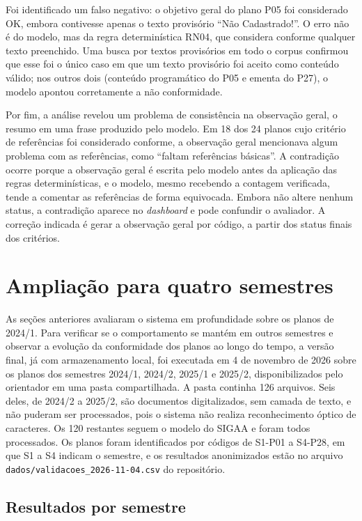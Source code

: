 Foi identificado um falso negativo: o objetivo geral do plano P05 foi considerado OK, embora contivesse apenas o texto provisório ``Não Cadastrado!''. O erro não é do modelo, mas da regra determinística RN04, que considera conforme qualquer texto preenchido. Uma busca por textos provisórios em todo o corpus confirmou que esse foi o único caso em que um texto provisório foi aceito como conteúdo válido; nos outros dois (conteúdo programático do P05 e ementa do P27), o modelo apontou corretamente a não conformidade.

Por fim, a análise revelou um problema de consistência na observação geral, o resumo em uma frase produzido pelo modelo. Em 18 dos 24 planos cujo critério de referências foi considerado conforme, a observação geral mencionava algum problema com as referências, como ``faltam referências básicas''. A contradição ocorre porque a observação geral é escrita pelo modelo antes da aplicação das regras determinísticas, e o modelo, mesmo recebendo a contagem verificada, tende a comentar as referências de forma equivocada. Embora não altere nenhum status, a contradição aparece no \textit{dashboard} e pode confundir o avaliador. A correção indicada é gerar a observação geral por código, a partir dos status finais dos critérios.

\section{Ampliação para quatro semestres}
\label{sec:res-semestres}

As seções anteriores avaliaram o sistema em profundidade sobre os planos de 2024/1. Para verificar se o comportamento se mantém em outros semestres e observar a evolução da conformidade dos planos ao longo do tempo, a versão final, já com armazenamento local, foi executada em 4 de novembro de 2026 sobre os planos dos semestres 2024/1, 2024/2, 2025/1 e 2025/2, disponibilizados pelo orientador em uma pasta compartilhada. A pasta continha 126 arquivos. Seis deles, de 2024/2 a 2025/2, são documentos digitalizados, sem camada de texto, e não puderam ser processados, pois o sistema não realiza reconhecimento óptico de caracteres. Os 120 restantes seguem o modelo do SIGAA e foram todos processados. Os planos foram identificados por códigos de S1-P01 a S4-P28, em que S1 a S4 indicam o semestre, e os resultados anonimizados estão no arquivo \texttt{dados/validacoes\_2026-11-04.csv} do repositório.

\subsection{Resultados por semestre}

